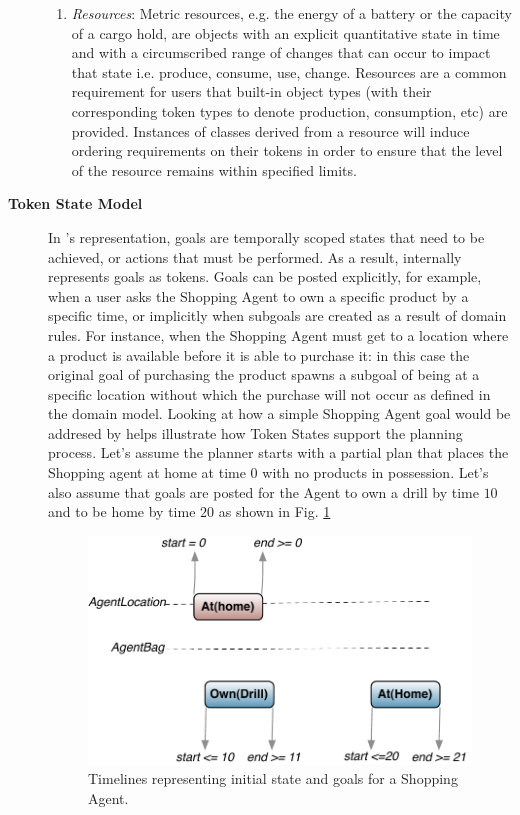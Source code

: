 \begin{description}
\begin{enumerate}
\item \textit{Resources}: Metric resources, e.g. the energy of a
  battery or the capacity of a cargo hold, are objects with an
  explicit quantitative state in time and with a circumscribed range
  of changes that can occur to impact that state i.e. produce,
  consume, use, change.  Resources are a common requirement for \eu
  users that built-in object types (with their corresponding token
  types to denote production, consumption, etc) are provided.
  Instances of classes derived from a resource will induce ordering
  requirements on their tokens in order to ensure that the level of
  the resource remains within specified limits.  

\end{enumerate}

\item[\textbf{Token State Model}] In \eu's representation, goals are
  temporally scoped states that need to be achieved, or actions that
  must be performed. As a result, \eu internally represents goals as
  tokens.  Goals can be posted explicitly, for example, when a user
  asks the Shopping Agent to own a specific product by a specific
  time, or implicitly when subgoals are created as a result of domain
  rules. For instance, when the Shopping Agent must get to a location
  where a product is available before it is able to purchase it: in
  this case the original goal of purchasing the product spawns a
  subgoal of being at a specific location without which the purchase
  will not occur as defined in the domain model.  Looking at how a
  simple Shopping Agent goal would be addresed by \eu helps illustrate
  how Token States support the planning process.  Let's assume the
  planner starts with a partial plan that places the Shopping agent at
  home at time $0$ with no products in possession. Let's also assume
  that goals are posted for the Agent to own a drill by time $10$ and
  to be home by time $20$ as shown in Fig. \ref{fig:europapr1}
  
  \begin{figure} \centering
    \includegraphics[scale=0.4]{figs/europa-pr-1.pdf}
    \caption{\small Timelines representing initial state and goals for a Shopping Agent.}
    \label{fig:europapr1}
  \end{figure}


\end{description}
